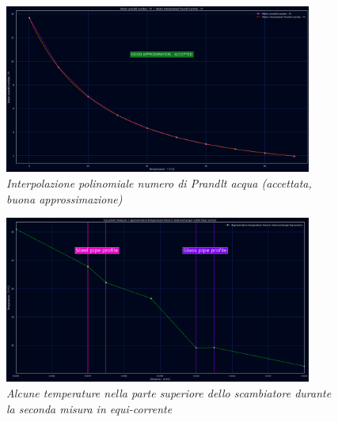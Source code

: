 \documentclass[a4paper,10pt]{article}                                                                                       %
\begin{document}
\begin{figure}[ht!]                                                                                                         %
  \centering                                                                                                                %
  \includegraphics[width=0.9\textwidth]{../final_doc/code_exports/imgs/water_intp_pr.png}                                   %
  \caption{\textit{Interpolazione polinomiale numero di Prandlt acqua (accettata, buona approssimazione)}}                  %
  \label{fig:water_intp_pr}                                                                                                 %
\end{figure}                                                                                                                %
\begin{figure}[ht!]                                                                                                         %
  \centering                                                                                                                %
  \includegraphics[width=0.9\textwidth]{../final_doc/code_exports/imgs/temp_trend.png}                                      %
  \caption{\textit{Alcune temperature nella parte superiore dello scambiatore durante la seconda misura in equi-corrente}}  %
  \label{fig:temp_trend}                                                                                                    %
\end{figure}                                                                                                                %
\end{document}
